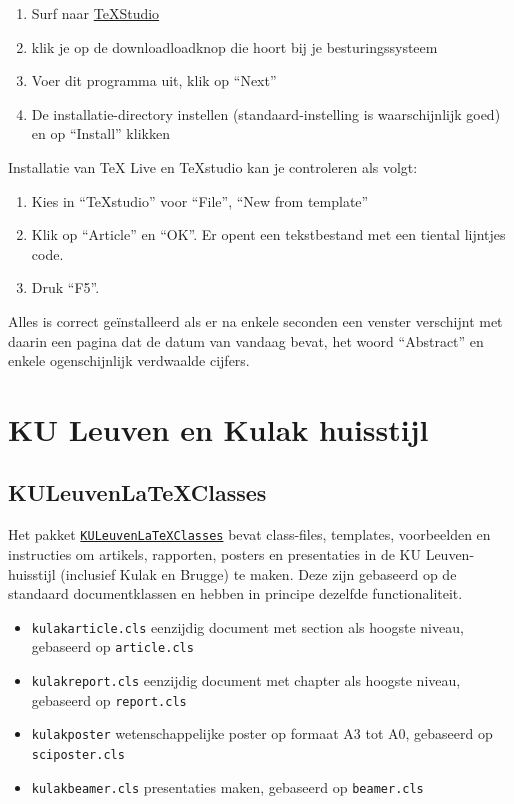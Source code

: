 \documentclass[kulak]{kulakarticle} %
\begin{document}
\begin{enumerate}
	\item Surf naar  \href{http://texstudio.sourceforge.net/}{TeXStudio}
	\item klik je op de downloadloadknop die hoort bij je besturingssysteem
	\item Voer dit programma uit, klik op ``Next''
	\item De installatie-directory instellen (standaard-instelling is waarschijnlijk goed) en op ``Install'' klikken
\end{enumerate}
Installatie van TeX Live en TeXstudio kan je controleren als volgt:
\begin{enumerate}
	\item Kies in ``TeXstudio'' voor ``File'', ``New from template''
	\item Klik op ``Article'' en ``OK''. Er opent een tekstbestand met een tiental lijntjes code.
	\item Druk ``F5''.
\end{enumerate}
Alles is correct geïnstalleerd als er na enkele seconden een venster verschijnt met daarin een pagina dat de datum van vandaag bevat, het woord ``Abstract'' en enkele ogenschijnlijk verdwaalde cijfers.

\section{KU Leuven en Kulak huisstijl}
\label{sec:huisstijl}
\subsection{KULeuvenLaTeXClasses}
Het pakket \href{https://github.com/srebry/KULeuvenLaTeXClasses}{\texttt{KULeuvenLaTeXClasses}} bevat class-files, templates, voorbeelden en instructies om artikels, rapporten, posters en presentaties in de KU Leuven-huisstijl (inclusief Kulak en Brugge) te maken. Deze zijn gebaseerd op de standaard documentklassen en hebben in principe dezelfde functionaliteit.
\begin{itemize}
	\item \texttt{kulakarticle.cls} eenzijdig document met section als hoogste niveau, gebaseerd op \texttt{article.cls}
	\item \texttt{kulakreport.cls} eenzijdig document met chapter als hoogste niveau, gebaseerd op \texttt{report.cls}
	\item \texttt{kulakposter} wetenschappelijke poster op formaat A3 tot A0, gebaseerd op \texttt{sciposter.cls}
	\item \texttt{kulakbeamer.cls} presentaties maken, gebaseerd op \texttt{beamer.cls}
\end{itemize}
\end{document}

